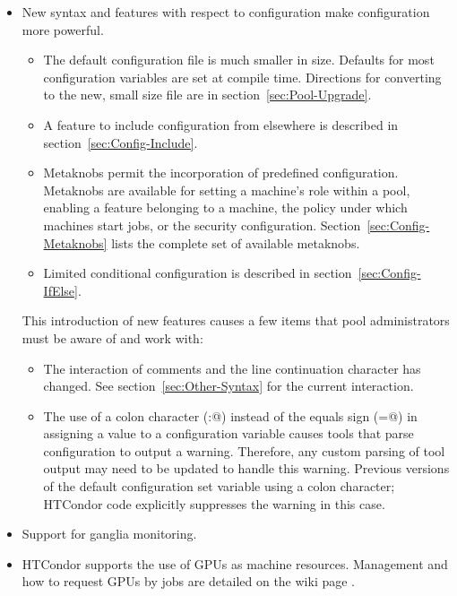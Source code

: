 \begin{itemize}

\item New syntax and features with respect to configuration
make configuration more powerful.
  \begin{itemize}
  \item The default configuration file is much smaller in size.
   Defaults for most configuration variables are set at compile time.
   Directions for converting to the new, small size file are in
   section~\ref{sec:Pool-Upgrade}.
  \item A feature to include configuration from elsewhere
   is described in section~\ref{sec:Config-Include}.
  \item Metaknobs permit the incorporation of predefined configuration.
   Metaknobs are available for setting a machine's role within
   a pool, enabling a feature belonging to a machine, the policy under which
   machines start jobs, or the security configuration.
   Section~\ref{sec:Config-Metaknobs} lists the complete set of available
   metaknobs.
  \item Limited conditional configuration is described in 
   section~\ref{sec:Config-IfElse}.
  \end{itemize}
This introduction of new features causes a few items that pool
administrators must be aware of and work with:
  \begin{itemize}
  \item The interaction of comments and the line continuation character
   has changed.  See  section~\ref{sec:Other-Syntax} for the current
   interaction. 
  \item The use of a colon character (\verb@:@) instead of the
   equals sign (\verb@=@) in assigning a value to a configuration variable
   causes tools that parse configuration to output a warning.
   Therefore, any custom parsing of tool output may need to be updated to
   handle this warning.
   Previous versions of the default configuration set variable
    using a colon character;
   HTCondor code explicitly suppresses the warning in this case.
  \end{itemize}

\item Support for ganglia monitoring.

\item HTCondor supports the use of GPUs as machine resources.
Management and how to request GPUs by jobs are detailed on
the wiki page
.


\end{itemize}
